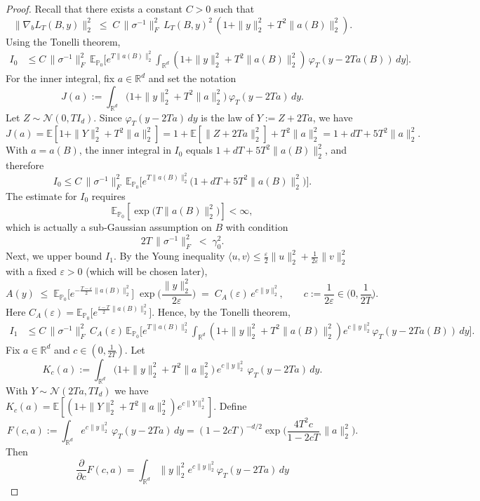 \documentclass[10pt,a4paper]{amsart}
\newcommand{\E}{\mathbb{E}}
\newcommand{\R}{\mathbb{R}}
\begin{document}
\begin{proof}
Recall that there exists a constant $C > 0$ such that
\[
\|\nabla_b L_T(B,y)\|_2^2
\;\le\;C\,\|\sigma^{-1}\|_F^2\,L_T(B,y)^2\,(1+\|y\|_2^2+T^2\|a(B)\|_2^2).
\]
Using the Tonelli theorem,
\[
\begin{aligned}
I_0
&\le C\,\|\sigma^{-1}\|_F^2\,\E_{\mathbb{P}_0}\!\Big[e^{T\|a(B)\|_2^2}
\!\!\int_{\R^d}\!(1+\|y\|_2^2+T^2\|a(B)\|_2^2)\,\varphi_T(y-2Ta(B))\,dy\Big].
\end{aligned}
\]For the inner integral, 
fix \(a\in\R^d\) and set the notation
\[
J(a):=\int_{\R^d}\bigl(1+\|y\|_2^2+T^2\|a\|_2^2\bigr)\,\varphi_T(y-2Ta)\,dy.
\]
Let \(Z\sim\mathcal N(0,T I_d)\). Since \(\varphi_T(y-2Ta)\,dy\) is the law of \(Y:=Z+2Ta\), we have 
\[
J(a)=\E\!\left[1+\|Y\|_2^2+T^2\|a\|_2^2\right]
=1+\E\left[\|Z+2Ta\|_2^2\right]+T^2\|a\|_2^2 = 1+dT+5T^2\|a\|_2^2.
\]
With \(a=a(B)\), the inner integral in \(I_0\) equals \(1+dT+5T^2\|a(B)\|_2^2\), and therefore
\[
I_0 \le C\,\|\sigma^{-1}\|_F^2\,
\E_{\mathbb{P}_0}\!\Big[e^{T\|a(B)\|_2^2}\big(1+dT+5T^2\|a(B)\|_2^2\big)\Big].
\]
The estimate for \(I_0\) requires
\[
\mathbb{E}_{\mathbb{P}_0}\!\left[\exp\!\big(T\|a(B)\|_2^{2}\big)\right] < \infty,
\]
which is actually a sub-Gaussian assumption on \(B\) with condition
\[
2T\,\|\sigma^{-1}\|_F^{2} \;<\; \gamma_0^{2}.
\]
Next, we upper bound $I_1$. By the Young inequality \(\langle u,v\rangle\le \tfrac{\varepsilon}{2}\|u\|_2^2+\tfrac{1}{2\varepsilon}\|v\|_2^2\) with a fixed $\varepsilon > 0$ (which will be chosen later),
\[
A(y)\;\le\;\E_{\mathbb{P}_0}\!\Big[e^{-\frac{T-\varepsilon}{2}\|a(B)\|_2^2}\Big]\;
\exp\!\Big(\frac{\|y\|_2^2}{2\varepsilon}\Big)
\;=\;C_A(\varepsilon)\,e^{c\|y\|_2^2},
\qquad c:=\frac{1}{2\varepsilon}\in\Big(0,\frac{1}{2T}\Big).
\]
Here \(C_A(\varepsilon)=\E_{\mathbb{P}_0}\!\big[e^{\frac{\varepsilon-T}{2}\|a(B)\|_2^2}\big]\).
Hence, by the Tonelli theorem,
\[
\begin{aligned}
I_1
&\le C\,\|\sigma^{-1}\|_F^2\,C_A(\varepsilon)\,
\E_{\mathbb{P}_0}\!\Big[e^{T\|a(B)\|_2^2}\!\int_{\R^d}(1+\|y\|_2^2+T^2\|a(B)\|_2^2)e^{c\|y\|_2^2}\varphi_T(y-2Ta(B))\,dy\Big].
\end{aligned}
\]
Fix \(a\in\R^d\) and \(c\in(0,\frac{1}{2T})\). Let
\[
K_c(a):=\int_{\R^d}\bigl(1+\|y\|_2^2+T^2\|a\|_2^2\bigr)\,e^{c\|y\|_2^2}\,\varphi_T(y-2Ta)\,dy.
\]
With \(Y\sim\mathcal N(2Ta,TI_d)\) we have \(K_c(a)=\E[(1+\|Y\|_2^2+T^2\|a\|_2^2)e^{c\|Y\|_2^2}]\).
Define
\[
F(c,a):=\int_{\R^d} e^{c\|y\|_2^2}\,\varphi_T(y-2Ta)\,dy
=(1-2cT)^{-d/2}\exp\!\Big(\frac{4T^2 c}{1-2cT}\,\|a\|_2^2\Big).
\]
Then
\[
\frac{\partial}{\partial c}F(c,a)
=\int_{\R^d}\|y\|_2^2 e^{c\|y\|_2^2}\varphi_T(y-2Ta)\,dy
\]
\end{proof}
\end{document}
